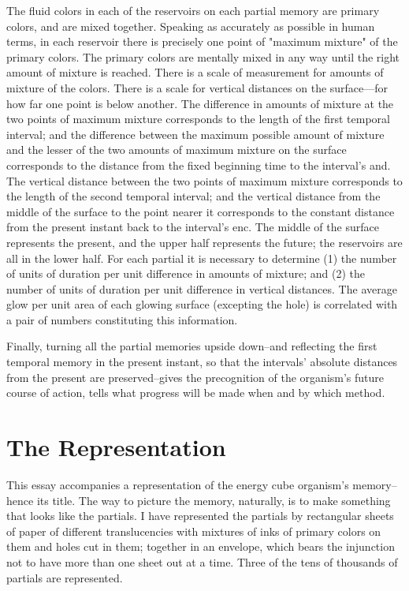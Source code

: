 \documentclass[10pt,twoside,draft]{memoir}
\begin{document}
{{The fluid colors in each of the reservoirs on each partial memory are 
primary colors, and are mixed together. Speaking as accurately as possible in 
human terms, in each reservoir there is precisely one point of "maximum 
mixture" of the primary colors. The primary colors are mentally mixed in 
any way until the right amount of mixture is reached. There is a scale of 
measurement for amounts of mixture of the colors. There is a scale for 
vertical distances on the surface---for how far one point is below another. The 
difference in amounts of mixture at the two points of maximum mixture 
corresponds to the length of the first temporal interval; and the difference 
between the maximum possible amount of mixture and the lesser of the two 
amounts of maximum mixture on the surface corresponds to the distance 
from the fixed beginning time to the interval's and. The vertical distance 
between the two points of maximum mixture corresponds to the length of 
the second temporal interval; and the vertical distance from the middle of 
the surface to the point nearer it corresponds to the constant distance from 
the present instant back to the interval's enc. The middle of the surface 
represents the present, and the upper half represents the future; the 
reservoirs are all in the lower half. For each partial it is necessary to 
determine (1) the number of units of duration per unit difference in 
amounts of mixture; and (2) the number of units of duration per unit 
difference in vertical distances. The average glow per unit area of each 
glowing surface (excepting the hole) is correlated with a pair of numbers 
constituting this information. 

Finally, turning all the partial memories upside down--and reflecting the 
first temporal memory in the present instant, so that the intervals' absolute 
distances from the present are preserved--gives the precognition of the 
organism's future course of action, tells what progress will be made when 
and by which method. 


\section*{The Representation}

This essay accompanies a representation of the energy cube organism's 
memory--hence its title. The way to picture the memory, naturally, is to 
make something that looks like the partials. I have represented the partials 
by rectangular sheets of paper of different translucencies with mixtures of 
inks of primary colors on them and holes cut in them; together in an 
envelope, which bears the injunction not to have more than one sheet out at 
a time. Three of the tens of thousands of partials are represented. 


}}
\end{document}

